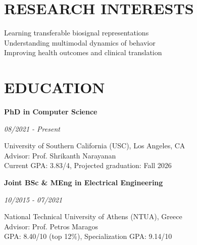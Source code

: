 \documentclass[margin]{res}
\newcommand{\cvheading}[2]{%
  \par\Needspace{4\baselineskip}\noindent
  \parbox[t]{\dimexpr\linewidth-110pt\relax}{\raggedright\bfseries #1}%
  \hfill\parbox[t]{98pt}{\raggedleft\itshape #2}%
  \par\nopagebreak[4]\vspace{-\parskip}\noindent\ignorespaces}
\begin{document}

\address{3710 McClintock Ave., RTH 318 \\ Los Angeles, CA 90089, United States}
\address{\color{accent} \href{mailto:avramidi@usc.edu}{avramidi@usc.edu} \\ \color{accent} \href{https://klean2050.github.io/}{klean2050.github.io}}

\begin{resume}

\section{RESEARCH INTERESTS}

Learning transferable biosignal representations \\ Understanding multimodal dynamics of behavior \\ Improving health outcomes and clinical translation

\section{EDUCATION}

\cvheading{PhD in Computer Science}{08/2021 - Present} University of Southern California (USC), Los Angeles, CA \\ Advisor: Prof. Shrikanth Narayanan
\\ Current GPA: 3.83/4, \; Projected graduation: Fall 2026

\vspace{-1mm}
\cvheading{Joint BSc \& MEng in Electrical Engineering}{10/2015 - 07/2021} National Technical University of Athens (NTUA), Greece \\ Advisor: Prof. Petros Maragos
\\ GPA: 8.40/10 (top 12\%), \; Specialization GPA: 9.14/10





\end{resume}
\end{document}
